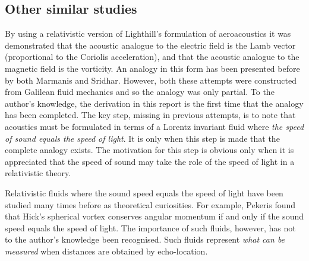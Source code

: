 \documentclass[10pt, fleqn,final,showtrims,oldfontcommands, article,a4paper,oneside]{memoir} %
\begin{document}
\subsection{Other similar studies}

By using a relativistic version of Lighthill's formulation of aeroacoustics it was demonstrated 
that the acoustic analogue to the electric field is the Lamb vector (proportional to the Coriolis acceleration),
and that the acoustic analogue to the magnetic field is the vorticity.
An analogy in this form has been presented before by both Marmanis\cite{Marmanis2000} and Sridhar\cite{Marmanis2000,Sridhar1998}.
However, both these attempts were constructed from Galilean fluid mechanics and so the analogy was only partial.
To the author's knowledge, the derivation in this report is the first time that the analogy has been  completed.
The key step, missing in previous attempts, 
is to note that acoustics must be formulated in terms of a Lorentz invariant fluid where
{\em the speed of sound equals the speed of light}.
It is only when this step is made that the complete analogy exists.
The motivation for this step is obvious only when it is appreciated that the speed of sound
may take the role of the speed of light in a relativistic theory.



Relativistic fluids where the sound speed equals the speed of light have been studied many times before
as theoretical curiosities\cite{Taub1978,Pekeris1976, Pekeris1977}.
For example, Pekeris found that Hick's spherical vortex conserves angular momentum if and only if
the sound speed equals the speed of light\cite{Pekeris1977}.
The importance of such fluids, however, has not to the author's knowledge been recognised.
Such fluids represent {\em what can be measured} when distances are obtained by echo-location.
\end{document}
